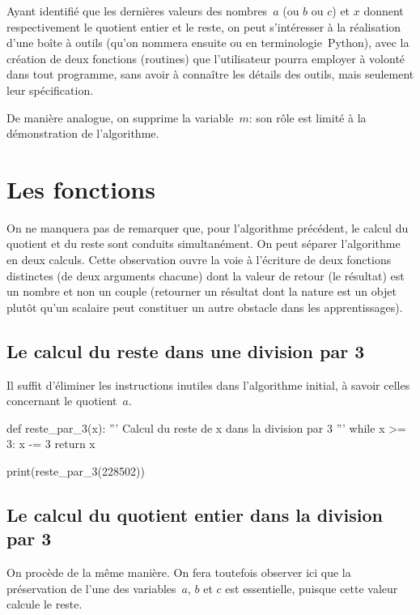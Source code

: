 Ayant identifié que les dernières valeurs des nombres~$a$ (ou $b$ ou $c$) et $x$ donnent respectivement le quotient entier et le reste, on peut s'intéresser à la réalisation d'une boîte à outils (qu'on nommera ensuite  ou  en terminologie~Python), avec la création de deux fonctions (routines) que l'utilisateur pourra employer à volonté dans tout programme, sans avoir à connaître les détails des outils, mais seulement leur spécification.

De manière analogue, on supprime la variable~$m$: son rôle est limité à la démonstration de l'algorithme.

\section{Les fonctions}

On ne manquera pas de remarquer que, pour l'algorithme précédent, le calcul du quotient et du reste sont conduits simultanément. On peut séparer l'algorithme en deux calculs. Cette observation ouvre la voie à l'écriture de deux fonctions distinctes (de deux arguments chacune) dont la valeur de retour (le résultat) est un nombre et non un couple (retourner un résultat dont la nature est un objet plutôt qu'un scalaire peut constituer un autre obstacle dans les apprentissages).



\subsection{Le calcul du reste dans une division par \num{3}}

Il suffit d'éliminer les instructions inutiles dans l'algorithme initial, à savoir celles concernant le quotient~$a$.

\begin{python}[distribution3.py]
def reste_par_3(x):
	'''
	Calcul du reste de x dans la division par 3
	'''
	while x >= 3:
		x -= 3
	return x
	
print(reste_par_3(228502))
\end{python}



\subsection{Le calcul du quotient entier dans la division par \num{3}}

On procède de la même manière. On fera toutefois observer ici que la préservation de l'une des variables~$a$, $b$ et $c$ est essentielle, puisque cette valeur calcule le reste.

